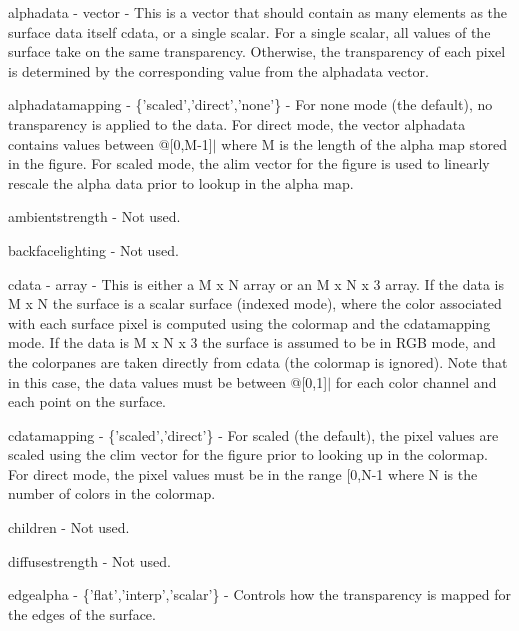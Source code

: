 \begin{DoxyItemize}
\item {\ttfamily alphadata} -\/ {\ttfamily vector} -\/ This is a vector that should contain as many elements as the surface data itself {\ttfamily cdata}, or a single scalar. For a single scalar, all values of the surface take on the same transparency. Otherwise, the transparency of each pixel is determined by the corresponding value from the {\ttfamily alphadata} vector.  
\item {\ttfamily alphadatamapping} -\/ {\ttfamily \{'scaled','direct','none'\}} -\/ For {\ttfamily none} mode (the default), no transparency is applied to the data. For {\ttfamily direct} mode, the vector {\ttfamily alphadata} contains values between @\mbox{[}0,M-\/1\mbox{]}$|$ where {\ttfamily M} is the length of the alpha map stored in the figure. For {\ttfamily scaled} mode, the {\ttfamily alim} vector for the figure is used to linearly rescale the alpha data prior to lookup in the alpha map.  
\item {\ttfamily ambientstrength} -\/ Not used.  
\item {\ttfamily backfacelighting} -\/ Not used.  
\item {\ttfamily cdata} -\/ {\ttfamily array} -\/ This is either a {\ttfamily M x N} array or an {\ttfamily M x N x 3} array. If the data is {\ttfamily M x N} the surface is a scalar surface (indexed mode), where the color associated with each surface pixel is computed using the colormap and the {\ttfamily cdatamapping} mode. If the data is {\ttfamily M x N x 3} the surface is assumed to be in R\-G\-B mode, and the colorpanes are taken directly from {\ttfamily cdata} (the colormap is ignored). Note that in this case, the data values must be between @\mbox{[}0,1\mbox{]}$|$ for each color channel and each point on the surface.  
\item {\ttfamily cdatamapping} -\/ {\ttfamily \{'scaled','direct'\}} -\/ For {\ttfamily scaled} (the default), the pixel values are scaled using the {\ttfamily clim} vector for the figure prior to looking up in the colormap. For {\ttfamily direct} mode, the pixel values must be in the range {\ttfamily \mbox{[}0,N-\/1} where {\ttfamily N} is the number of colors in the colormap.  
\item {\ttfamily children} -\/ Not used.  
\item {\ttfamily diffusestrength} -\/ Not used.  
\item {\ttfamily edgealpha} -\/ {\ttfamily \{'flat','interp','scalar'\}} -\/ Controls how the transparency is mapped for the edges of the surface.  

\end{DoxyItemize}
